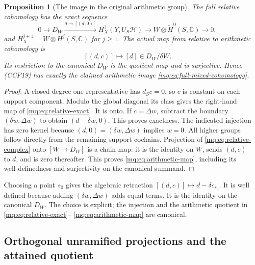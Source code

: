 \documentclass[11pt,a4paper]{article}
\newtheorem{proposition}[theorem]{Proposition}
\theoremstyle{definition}\newtheorem{definition}[theorem]{Definition}
\newcommand{\C}{\mathbb C}\newcommand{\R}{\mathbb R}
\begin{document}
\begin{proposition}[The image in the original arithmetic group]
\label{mq:prop:arithmetic-image}
The full relative cohomology has the exact sequence
\[
 0\longrightarrow D_W\xrightarrow{d\mapsto[(d,0)]}
 H_X^1(Y,U_S\mathcal H)
 \longrightarrow W\otimes\widetilde H^0(S,\C)
 \longrightarrow0,
 \tag{MQ10}\label{mq:eq:relative-exact}
\]
and $H_X^{j+1}=W\otimes H^j(S,\C)$ for $j\ge1$.
The actual map from relative to arithmetic cohomology is
\[
 [(d,c)]\longmapsto[d]\in D_W/\delta W.
 \tag{MQ11}\label{mq:eq:arithmetic-map}
\]
Its restriction to the canonical $D_W$ is the quotient map and
is surjective. Hence (CCF19) has exactly the claimed arithmetic
image \eqref{mq:eq:full-mixed-cohomology}.
\end{proposition}
\begin{proof}
A closed degree-one representative has $d_Sc=0$, so $c$ is
constant on each support component. Modulo the global diagonal
its class gives the right-hand map of \eqref{mq:eq:relative-exact}.
It is onto. If $c=\Delta w$, subtract the boundary
$(\delta w,\Delta w)$ to obtain $(d-\delta w,0)$. This proves
exactness. The indicated injection has zero kernel because
$(d,0)=(\delta w,\Delta w)$ implies $w=0$. All higher groups
follow directly from the remaining support cochains. Projection
of \eqref{mq:eq:relative-complex} onto $[W\to D_W]$ is a chain map:
it is the identity on $W$, sends $(d,c)$ to $d$, and is zero
thereafter. This proves \eqref{mq:eq:arithmetic-map}, including its
well-definedness and surjectivity on the canonical summand.
\end{proof}

Choosing a point $s_0$ gives the algebraic retraction
$[(d,c)]\mapsto d-\delta c_{s_0}$. It is well defined because
adding $(\delta w,\Delta w)$ adds equal terms. It is the identity
on the canonical $D_W$. The choice is explicit; the injection
and the arithmetic quotient in \eqref{mq:eq:relative-exact}--
\eqref{mq:eq:arithmetic-map} are canonical.

\subsection{Orthogonal unramified projections and the attained quotient}
\end{document}
